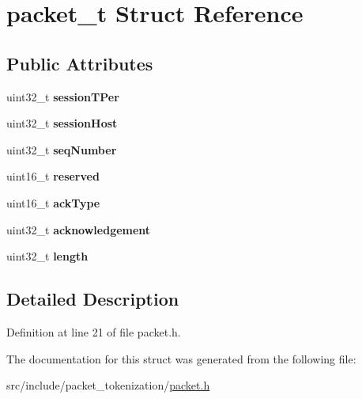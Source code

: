 \hypertarget{structpacket__t}{}\section{packet\+\_\+t Struct Reference}
\label{structpacket__t}
\subsection*{Public Attributes}
\begin{DoxyCompactItemize}
\item 
\hypertarget{structpacket__t_ae8478e7a1afb27b741a22d3fe914bcdc}{}uint32\+\_\+t {\bfseries session\+T\+Per}\label{structpacket__t_ae8478e7a1afb27b741a22d3fe914bcdc}

\item 
\hypertarget{structpacket__t_a5b9382491637c71048500f054cf4b97b}{}uint32\+\_\+t {\bfseries session\+Host}\label{structpacket__t_a5b9382491637c71048500f054cf4b97b}

\item 
\hypertarget{structpacket__t_a692ffd4035b32de9c8dade4772753ce9}{}uint32\+\_\+t {\bfseries seq\+Number}\label{structpacket__t_a692ffd4035b32de9c8dade4772753ce9}

\item 
\hypertarget{structpacket__t_a54cb45a7b5c22a69646bcf49899024cc}{}uint16\+\_\+t {\bfseries reserved}\label{structpacket__t_a54cb45a7b5c22a69646bcf49899024cc}

\item 
\hypertarget{structpacket__t_aacc113c99863a5727511730a637af3fb}{}uint16\+\_\+t {\bfseries ack\+Type}\label{structpacket__t_aacc113c99863a5727511730a637af3fb}

\item 
\hypertarget{structpacket__t_a9a5a945d204635838bb0d6a9ad5a7a7b}{}uint32\+\_\+t {\bfseries acknowledgement}\label{structpacket__t_a9a5a945d204635838bb0d6a9ad5a7a7b}

\item 
\hypertarget{structpacket__t_aacf0d8a363359eef6302f7341dd22839}{}uint32\+\_\+t {\bfseries length}\label{structpacket__t_aacf0d8a363359eef6302f7341dd22839}

\end{DoxyCompactItemize}


\subsection{Detailed Description}


Definition at line 21 of file packet.\+h.



The documentation for this struct was generated from the following file\+:\begin{DoxyCompactItemize}
\item 
src/include/packet\+\_\+tokenization/\hyperlink{packet_8h}{packet.\+h}\end{DoxyCompactItemize}
